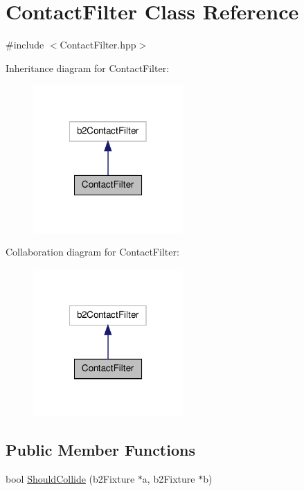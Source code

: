 \hypertarget{class_contact_filter}{\section{Contact\-Filter Class Reference}
\label{class_contact_filter}
}


{\ttfamily \#include $<$Contact\-Filter.\-hpp$>$}



Inheritance diagram for Contact\-Filter\-:\nopagebreak
\begin{figure}[H]
\begin{center}
\leavevmode
\includegraphics[width=162pt]{class_contact_filter__inherit__graph}
\end{center}
\end{figure}


Collaboration diagram for Contact\-Filter\-:\nopagebreak
\begin{figure}[H]
\begin{center}
\leavevmode
\includegraphics[width=162pt]{class_contact_filter__coll__graph}
\end{center}
\end{figure}
\subsection*{Public Member Functions}
\begin{DoxyCompactItemize}
\item 
bool \hyperlink{class_contact_filter_aa1f43a83fda36c0d4e0479e370350585}{Should\-Collide} (b2\-Fixture $\ast$a, b2\-Fixture $\ast$b)
\end{DoxyCompactItemize}


